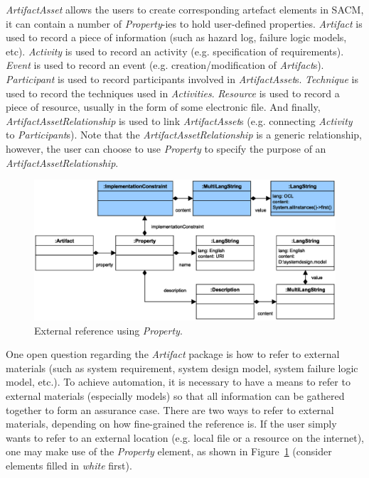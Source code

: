 \textit{ArtifactAsset} allows the users to create corresponding artefact elements in SACM, it can contain a number of \textit{Property}-ies to hold user-defined properties. \textit{Artifact} is used to record a piece of information (such as hazard log, failure logic models, etc). \textit{Activity} is used to record an activity (e.g. specification of requirements). \textit{Event} is used to record an event (e.g. creation/modification of \textit{Artifact}s). \textit{Participant} is used to record participants involved in \textit{ArtifactAsset}s. \textit{Technique} is used to record the techniques used in \textit{Activities}. \textit{Resource} is used to record a piece of resource, usually in the form of some electronic file. And finally, \textit{ArtifactAssetRelationship} is used to link \textit{ArtifactAsset}s (e.g. connecting \textit{Activity} to \textit{Participant}s). Note that the \textit{ArtifactAssetRelationship} is a generic relationship, however, the user can choose to use \textit{Property} to specify the purpose of an \textit{ArtifactAssetRelationship}. 

\begin{figure}
	\centering
	\includegraphics[width=1\linewidth]{fig/artifact2.eps}
	\caption{External reference using \textit{Property}.}
	\label{fig:artifact1}
\end{figure}

One open question regarding the \textit{Artifact} package is how to refer to external materials (such as system requirement, system design model, system failure logic model, etc.). To achieve automation, it is necessary to have a means to refer to external materials (especially models) so that all information can be gathered together to form an assurance case. 
There are two ways to refer to external materials, depending on how fine-grained the reference is. If the user simply wants to refer to an external location (e.g. local file or a resource on the internet), one may make use of the \textit{Property} element, as shown in Figure~\ref{fig:artifact1} (consider elements filled in \textit{white} first).

